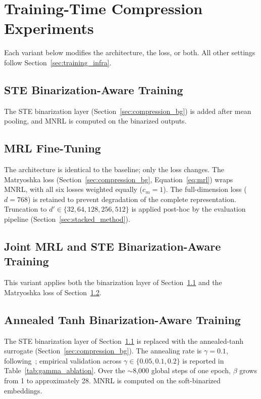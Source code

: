 \section{Training-Time Compression Experiments}
\label{sec:training_time}

Each variant below modifies the architecture, the loss, or both. All other
settings follow Section~\ref{sec:training_infra}.

\subsection{STE Binarization-Aware Training}
\label{sec:bat_ste}

The STE binarization layer (Section~\ref{sec:compression_bg}) is added
after mean pooling, and MNRL is computed on the binarized outputs.

\subsection{MRL Fine-Tuning}
\label{sec:mrl_train}

The architecture is identical to the baseline; only the loss changes. The
Matryoshka loss (Section~\ref{sec:compression_bg}, Equation~\ref{eq:mrl})
wraps MNRL, with all six losses weighted equally ($c_m = 1$). The
full-dimension loss ($d = 768$) is retained to prevent degradation of the
complete representation. Truncation to $d' \in \{32, 64, 128, 256, 512\}$
is applied post-hoc by the evaluation pipeline (Section~\ref{sec:stacked_method}).

\subsection{Joint MRL and STE Binarization-Aware Training}
\label{sec:mrl_bat}

This variant applies both the binarization layer of Section~\ref{sec:bat_ste}
and the Matryoshka loss of Section~\ref{sec:mrl_train}.

\subsection{Annealed Tanh Binarization-Aware Training}
\label{sec:bat_atanh}

The STE binarization layer of Section~\ref{sec:bat_ste} is replaced with
the annealed-tanh surrogate (Section~\ref{sec:compression_bg}). The
annealing rate is $\gamma = 0.1$, following~\cite{yamada2021efficient};
empirical validation across $\gamma \in \{0.05, 0.1, 0.2\}$ is reported
in Table~\ref{tab:gamma_ablation}. Over the $\sim$8{,}000 global steps
of one epoch, $\beta$ grows from 1 to approximately 28. MNRL is computed
on the soft-binarized embeddings.

